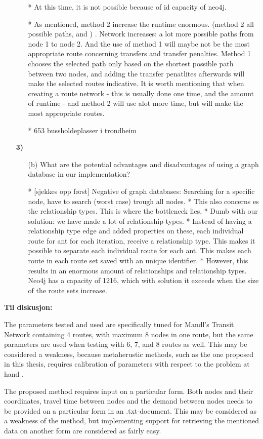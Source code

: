 \begin{enumerate}[label=\textbf{\arabic*})]
\begin{enumerate}
    * At this time, it is not possible because of id capacity of neo4j. 

     * As mentioned, method 2 increase the runtime enormous. (method 2 all possible paths, and ) . Network increases: a lot more possible paths from node 1 to node 2. And the use of method 1 will maybe not be the most appropriate route concerning transfers and transfer penalties. Method 1 chooses the selected path only based on the shortest possible path between two nodes, and adding the transfer penatlites afterwards will make the selected routes indicative. It is worth mentioning that when creating a route network - this is usually done one time, and the amount of runtime - and method 2 will use alot more time, but will make the most appropriate routes. 

     * 653 bussholdeplasser i trondheim %


    \end{enumerate}
\item[\textbf{3)}]
	\begin{enumerate}
	\item[(b)]  What are the potential advantages and disadvantages of using a graph database in our implementation?

    * [sjekkes opp først] Negative of graph databases: Searching for a specific node, have to search (worst case) trough all nodes. 
    * This also concerns es the relationship types. This is where the bottleneck lies. 
    * Dumb with our solution: we have made a lot of relationship types. 
    * Instead of having a relationship type edge and added properties on these, each individual route for ant for each iteration, receive a relationship type. This makes it possible to separate each individual route for each ant. This makes each route in each route set saved with an unique identifier. 
    * However, this results in an enormous amount of relationships and relationship types. Neo4j has a capacity of 1216, which with solution it exceeds when the size of the route sets increase. 


    \end{enumerate}
\end{enumerate}

\textbf{\color{blue} Til diskusjon:}

The parameters tested and used are specifically tuned for Mandl's Transit Network containing 4 routes, with maximum 8 nodes in one route, but the same parameters are used when testing with 6, 7, and 8 routes as well. This may be considered a weakness, because metaherustic methods, such as the one proposed in this thesis, requires calibration of parameters with respect to the problem at hand \citep{dobslaw09}.

The proposed method requires input on a particular form. Both nodes and their coordinates, travel time between nodes and the demand between nodes needs to be provided on a particular form in an .txt-document. This may be considered as a weakness of the method, but implementing support for retrieving the mentioned data on another form are considered as fairly easy.

